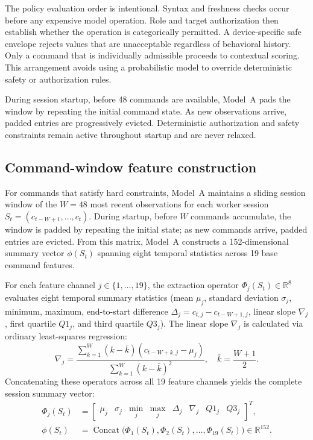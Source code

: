 \documentclass[journal]{IEEEtran}
\DeclareMathOperator{\Concat}{Concat}
\begin{document}
The policy evaluation order is intentional. Syntax and freshness checks occur before any expensive model operation. Role and target authorization then establish whether the operation is categorically permitted. A device-specific safe envelope rejects values that are unacceptable regardless of behavioral history. Only a command that is individually admissible proceeds to contextual scoring. This arrangement avoids using a probabilistic model to override deterministic safety or authorization rules.

During session startup, before 48 commands are available, Model~A pads the window by repeating the initial command state. As new observations arrive, padded entries are progressively evicted. Deterministic authorization and safety constraints remain active throughout startup and are never relaxed.

\subsection{Command-window feature construction}
For commands that satisfy hard constraints, Model~A maintains a sliding session window of the $W=48$ most recent observations for each worker session $S_t = (c_{t-W+1}, \dots, c_t)$. During startup, before $W$ commands accumulate, the window is padded by repeating the initial state; as new commands arrive, padded entries are evicted. From this matrix, Model~A constructs a 152-dimensional summary vector $\phi(S_t)$ spanning eight temporal statistics across 19 base command features.

For each feature channel $j \in \{1,\dots,19\}$, the extraction operator $\Phi_j(S_t) \in \mathbb{R}^8$ evaluates eight temporal summary statistics (mean $\mu_j$, standard deviation $\sigma_j$, minimum, maximum, end-to-start difference $\Delta_j = c_{t,j} - c_{t-W+1,j}$, linear slope $\nabla_j$, first quartile $Q1_j$, and third quartile $Q3_j$). The linear slope $\nabla_j$ is calculated via ordinary least-squares regression:
\begin{equation}
\nabla_j = \frac{\sum_{k=1}^W (k - \bar{k})(c_{t-W+k,j} - \mu_j)}{\sum_{k=1}^W (k - \bar{k})^2}, \quad \bar{k} = \frac{W+1}{2}.
\end{equation}
Concatenating these operators across all 19 feature channels yields the complete session summary vector:
\begin{align}
\Phi_j(S_t) &= \begin{bmatrix} \mu_j & \sigma_j & \min_j & \max_j & \Delta_j & \nabla_j & Q1_j & Q3_j \end{bmatrix}^T, \\
\phi(S_t) &= \Concat\bigl( \Phi_1(S_t), \Phi_2(S_t), \dots, \Phi_{19}(S_t) \bigr) \in \mathbb{R}^{152}.
\end{align}
\end{document}
